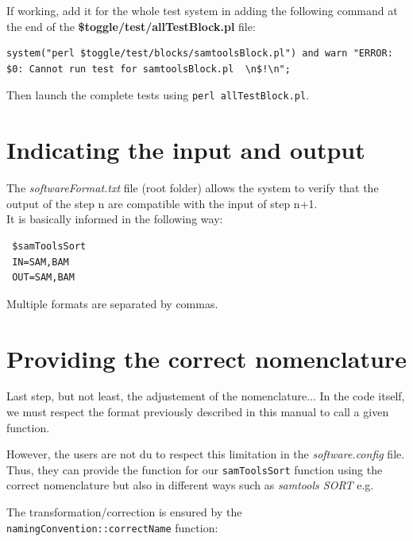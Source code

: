 \documentclass[a4paper,10pt]{report}
\begin{document}
If working, add it for the whole test system in adding the following command at the end of the \textbf{\$toggle/test/allTestBlock.pl} file:

\begin{lstlisting}
system("perl $toggle/test/blocks/samtoolsBlock.pl") and warn "ERROR: $0: Cannot run test for samtoolsBlock.pl  \n$!\n";
\end{lstlisting}

Then launch the complete tests using \texttt{perl allTestBlock.pl}.



\section{Indicating the input and output}

The \emph{softwareFormat.txt} file (root folder) allows the system to verify that the output of the step n are compatible with the input of step n+1.\\

\noindent It is basically informed in the following way:

\begin{verbatim}
 $samToolsSort
 IN=SAM,BAM
 OUT=SAM,BAM
\end{verbatim}

\noindent Multiple formats are separated by commas.

\section{Providing the correct nomenclature}

Last step, but not least, the adjustement of the nomenclature... In the code itself, we must respect the format previously described in this manual to call a given function.

However, the users are not du to respect this limitation in the \emph{software.config} file. Thus, they can provide the function for our \texttt{samToolsSort} function using the correct nomenclature but also in different ways such as \textit{samtools SORT} e.g.

The transformation/correction is ensured by the \texttt{namingConvention::correctName} function:
\end{document}
